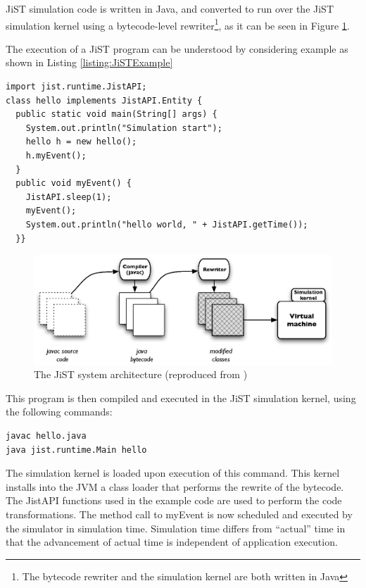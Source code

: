 JiST simulation code is written in Java, and converted to run over the JiST 
simulation kernel using a bytecode-level rewriter\footnote{The bytecode 
rewriter and the simulation kernel are both written in Java},  as it can be
seen in Figure \ref{Fig:JiST_architecture}.

The execution of a JiST program can be understood by considering example as
shown in Listing \ref{listing:JiSTExample}

\begin{lstlisting}[frame=trbl, basewidth={0.55em, 0.6em}, captionpos=b, 
basicstyle=\ttfamily\footnotesize, breaklines, caption = Example JiST program (reproduced from \cite{barr_JIST:2005}, label = listing:JiSTExample]  
import jist.runtime.JistAPI;  
class hello implements JistAPI.Entity { 
  public static void main(String[] args) { 
    System.out.println("Simulation start"); 
    hello h = new hello(); 
    h.myEvent(); 
  } 
  public void myEvent() { 
    JistAPI.sleep(1); 
    myEvent(); 
    System.out.println("hello world, " + JistAPI.getTime()); 
  }} 
\end{lstlisting}

\begin{figure}
\centering
\includegraphics[width=\textwidth]{img/JiST_architecture.eps} 
\caption[The JiST System Architecture]{The JiST system architecture (reproduced from
\cite{barr_JIST:2005})}
\label{Fig:JiST_architecture}
\end{figure}  
 
This program is then compiled and executed in the JiST simulation
kernel, using the following commands:

  
\begin{lstlisting}[frame=trbl, basewidth={0.55em, 0.6em}, captionpos=b, 
basicstyle=\ttfamily\footnotesize, breaklines, caption = Execution of the
program in the JiST, label = listing:JiST ]  
javac hello.java
java jist.runtime.Main hello
\end{lstlisting}


The simulation kernel is loaded upon execution of this command. This kernel
installs into the JVM a class loader that performs the rewrite of the bytecode.
The JistAPI functions used in the example code are used to perform the
code transformations. The method call to myEvent is now scheduled and executed
by the simulator in simulation time. Simulation time differs from ``actual''
time in that the advancement of actual time is independent of application
execution. 
 
